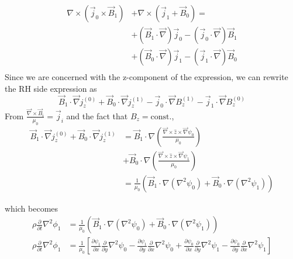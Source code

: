 \documentclass{article}
\begin{document}
\begin{equation}
    \begin{split}
        \nabla \times \left( \vec{j}_0 \times \vec{B}_1 \right) &+ \nabla \times \left( \vec{j}_1 + \vec{B}_0 \right) = \\
                                                                &+ \left( \vec{B}_1 \cdot \vec{\nabla}  \right) \vec{j}_0 - \left( \vec{j}_0 \cdot  \vec{\nabla}  \right) \vec{B}_1 \\
                                                                &+ \left( \vec{B}_0 \cdot \vec{\nabla}  \right) \vec{j}_1 - \left( \vec{j}_1 \cdot  \vec{\nabla}  \right) \vec{B}_0 \\
    \end{split}
\end{equation} 
Since we are concerned with the z-component of the expression, we can rewrite the RH side expression as
\begin{equation} \vec{B}_1 \cdot \vec{\nabla} j_z^{(0)} + \vec{B}_0 \cdot \vec{\nabla} j_z^{(1)} - \vec{j}_0 \cdot \vec{\nabla} B_z^{(1)} - \vec{j}_1 \cdot \vec{\nabla} B_z^{(0)}
\end{equation} 
From $\frac{\vec{\nabla} \times \vec{B}_i}{\mu_0}=\vec{j}_i$ and the fact that $B_z=\text{const.}$,
\begin{equation}
    \begin{split}
        \vec{B}_1 \cdot \vec{\nabla} j_z^{(0)} + \vec{B}_0 \cdot \vec{\nabla} j_z^{(1)} &= \vec{B}_1 \cdot \nabla \left( \frac{\vec{\nabla} \times \hat{z} \times \vec{\nabla}\psi_0}{\mu_0} \right) \\
                                                                                        &+ \vec{B}_0 \cdot \nabla \left( \frac{\vec{\nabla} \times \hat{z} \times \vec{\nabla}\psi_1}{\mu_0} \right) \\
                                                                                        &= \frac{1}{\mu_0} \left( \vec{B}_1 \cdot \nabla \left( \nabla^2 \psi_0 \right) + \vec{B}_0 \cdot \nabla \left( \nabla^2 \psi_1 \right) \right)
    \end{split}
\end{equation} 

which becomes
\begin{equation}
    \begin{split}
        \rho \frac{\partial}{\partial t} \nabla ^2 \phi_1 &= \frac{1}{\mu_0} \left( \vec{B}_1 \cdot \nabla \left( \nabla^2 \psi_0 \right) + \vec{B}_0 \cdot \nabla \left( \nabla^2 \psi_1 \right) \right) \\
        \rho \frac{\partial}{\partial t} \nabla ^2 \phi_1 &= \frac{1}{\mu_0} \left[ \frac{\partial \psi_1}{\partial x} \frac{\partial}{\partial y} \nabla ^2 \psi_0 - \frac{\partial \psi_1}{\partial y} \frac{\partial}{\partial x} \nabla ^2 \psi_0 + \frac{\partial \psi_0}{\partial x} \frac{\partial}{\partial y} \nabla ^2 \psi_1 - \frac{\partial \psi_0}{\partial y} \frac{\partial}{\partial x} \nabla ^2 \psi_1 \right]
    \end{split}
\end{equation} 
\end{document}
